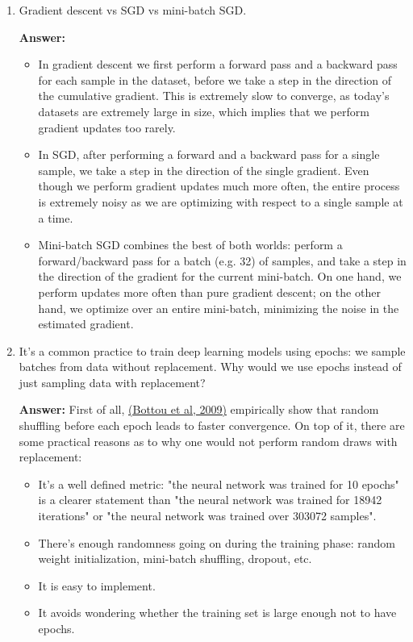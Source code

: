 \documentclass{article}
\newenvironment{QandA}{\begin{enumerate}[label=\arabic*.]}{\end{enumerate}}
\newenvironment{answer}{\par\normalfont \textbf{Answer:}}{}
\begin{document}
\begin{QandA}
    \item Gradient descent vs SGD vs mini-batch SGD.
    \begin{answer}
        \begin{itemize}
            \item In gradient descent we first perform a forward pass and a backward pass for each sample in the dataset, before we take a step in the direction of the cumulative gradient. This is extremely slow to converge, as today's datasets are extremely large in size, which implies that we perform gradient updates too rarely. 
            \item In SGD, after performing a forward and a backward pass for a single sample, we take a step in the direction of the single gradient. Even though we perform gradient updates much more often, the entire process is extremely noisy as we are optimizing with respect to a single sample at a time. 
            \item Mini-batch SGD combines the best of both worlds: perform a forward/backward pass for a batch (e.g. 32) of samples, and take a step in the direction of the gradient for the current mini-batch. On one hand, we perform updates more often than pure gradient descent; on the other hand, we optimize over an entire mini-batch, minimizing the noise in the estimated gradient. 
        \end{itemize}   
    \end{answer}

    \item It’s a common practice to train deep learning models using epochs: we sample batches from data without replacement. Why would we use epochs instead of just sampling data with replacement?
    \begin{answer}
        First of all, \href{https://leon.bottou.org/publications/pdf/slds-2009.pdf}{(Bottou et al, 2009)} empirically show that random shuffling before each epoch leads to faster convergence. On top of it, there are some practical reasons as to why one would not perform random draws with replacement:
        \begin{itemize}
            \item It's a well defined metric: "the neural network was trained for 10 epochs" is a clearer statement than "the neural network was trained for 18942 iterations" or "the neural network was trained over 303072 samples".
            \item There's enough randomness going on during the training phase: random weight initialization, mini-batch shuffling, dropout, etc.
            \item It is easy to implement.
            \item It avoids wondering whether the training set is large enough not to have epochs.
        \end{itemize}
        

\end{answer}
\end{QandA}
\end{document}
